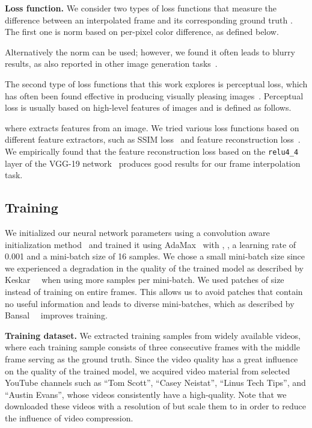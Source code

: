 \documentclass[10pt,twocolumn,letterpaper]{article}
\begin{document}
\vspace{0.05in}
\noindent\textbf{Loss function.}
We consider two types of loss functions that measure the difference between an interpolated frame  and its corresponding ground truth . The first one is  norm based on per-pixel color difference, as defined below.

Alternatively the  norm can be used; however, we found it often leads to blurry results, as also reported in other image generation tasks~\cite{Goroshin_NIPS_2015, Long_ECCV_2016, Mathieu_ICLR_2016, Ranzato_CORR_2014, Srivastava_ICML_2015}.

The second type of loss functions that this work explores is perceptual loss, which has often been found effective in producing visually pleasing images~\cite{Dosovitskiy_NIPS_2016, Johnson_ECCV_2016, Ledig_CORR_2016, Sajjadi_CORR_2016, Zhu_ECCV_2016}. Perceptual loss is usually based on high-level features of images and is defined as follows.

where  extracts features from an image. We tried various loss functions based on different feature extractors, such as SSIM loss~\cite{Ridgeway_CORR_2015} and feature reconstruction loss~\cite{Johnson_ECCV_2016}. We empirically found that the feature reconstruction loss based on the \verb|relu4_4| layer of the VGG-19 network~\cite{Simonyan_CORR_2014} produces good results for our frame interpolation task. 

\subsection{Training}

We initialized our neural network parameters using a convolution aware initialization method~\cite{Aghajanyan_CORR_2017} and trained it using AdaMax~\cite{Kingma_CORR_2014} with , , a learning rate of 0.001 and a mini-batch size of 16 samples. We chose a small mini-batch size since we experienced a degradation in the quality of the trained model as described by Keskar~\etal~\cite{Keskar_CORR_2016} when using more samples per mini-batch. We used patches of size  instead of training on entire frames. This allows us to avoid patches that contain no useful information and leads to diverse mini-batches, which as described by Bansal~\etal~\cite{Bansal_CORR_2017} improves training.

\vspace{0.05in}
\noindent\textbf{Training dataset.}
We extracted training samples from widely available videos, where each training sample consists of three consecutive frames with the middle frame serving as the ground truth. Since the video quality has a great influence on the quality of the trained model, we acquired video material from selected YouTube channels such as ``Tom Scott'', ``Casey Neistat'', ``Linus Tech Tips'', and ``Austin Evans'', whose videos consistently have a high-quality. Note that we downloaded these videos with a resolution of  but scale them to  in order to reduce the influence of video compression.
\end{document}
